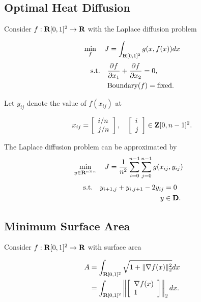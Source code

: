 \documentclass{article}
\begin{document}

    \subsection{Optimal Heat Diffusion}
    Consider $f:\textbf{R}[0,1]^2\to\textbf{R}$ with the Laplace diffusion problem

    \begin{align*}
        \min_f\quad J = \int_{ \textbf{R}[0,1]^2  } g(x,f(x)) dx
    \end{align*}
    \begin{align*}
        \text{s.t.}\quad &\frac{\partial f}{\partial x_1}+\frac{\partial f}{\partial x_2}=0,\\
        &\text{Boundary}(f) = \text{fixed}.
    \end{align*}

    Let $y_{ij}$ denote the value of $f(x_{ij})$ at  
    
    \begin{align*}
        x_{ij}=\left[\begin{array}{lllllllllllllllllll}i/n \\ j/n\end{array}\right],\quad \left[\begin{array}{lllllllllllllllllll}i\\j\end{array}\right]\in\textbf{Z}[0,n-1]^2.
    \end{align*}

    The Laplace diffusion problem can be approximated by
    \begin{align*}
        \min_{y\in\textbf{R}^{n\times n}}\quad J&=\frac{1}{n^2}\sum_{i=0}^{n-1}\sum_{j=0}^{n-1} g(x_{ij},y_{ij})
    \end{align*}
    \begin{align*}
        \text{s.t.}\quad y_{i+1,j}+y_{i,j+1}-2y_{ij}&=0\\
        y&\in\textbf{D}.
    \end{align*}


\clearpage
\subsection{Minimum Surface Area}
    Consider $f:\textbf{R}[0,1]^2\to\textbf{R}$ with surface area \cite[p.~159]{bv_cvxbook}

    \begin{align*}
        A&=\int_{\textbf{R}[0,1]^2}\sqrt{1+\|\nabla f(x)\|_2^2}dx\\
        &=\int_{\textbf{R}[0,1]^2}\left\|\left[\begin{array}{lllllllllllllllllll}\nabla f(x)\\1\end{array}\right]\right\|_2dx.
    \end{align*}
\end{document}
